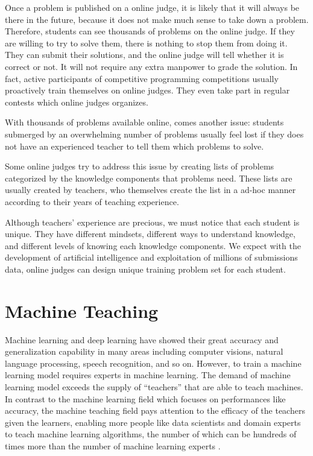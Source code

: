            Once a problem is published on a online judge,
            it is likely that it will always be there in the future,
            because it does not make much sense to take down a problem.
            Therefore, students can see thousands of problems on the online judge.
            If they are willing to try to solve them,
            there is nothing to stop them from doing it.
            They can submit their solutions,
            and the online judge will tell whether it is correct or not.
            It will not require any extra manpower to grade the solution.
            In fact, active participants of competitive programming competitions usually proactively
            train themselves on online judges.
            They even take part in regular contests which online judges organizes.

            With thousands of problems available online, comes another issue:
            students submerged by an overwhelming number of problems usually feel lost
            if they does not have an experienced teacher to tell them which problems to solve.

            Some online judges try to address this issue by creating lists of problems
            categorized by the knowledge components that problems need.
            These lists are usually created by teachers,
            who themselves create the list in a ad-hoc manner
            according to their years of teaching experience.

            Although teachers' experience are precious,
            we must notice that each student is unique.
            They have different mindsets, different ways to understand knowledge,
            and different levels of knowing each knowledge components.
            We expect with the development of artificial intelligence
            and exploitation of millions of submissions data,
            online judges can design unique training problem set for each student.


\section{Machine Teaching}

    Machine learning and deep learning have showed their great accuracy and generalization capability
    in many areas including computer visions, natural language processing, speech recognition, and so on.
    However, to train a machine learning model requires experts in machine learning.
    The demand of machine learning model exceeds the supply of ``teachers'' that are able to teach machines.
    In contrast to the machine learning field which focuses on performances like accuracy,
    the machine teaching field pays attention to the efficacy of the teachers given the learners,
    enabling more people like data scientists and domain experts to teach machine learning algorithms,
    the number of which can be hundreds of times more than the number of machine learning experts \cite{Simard2017}.

